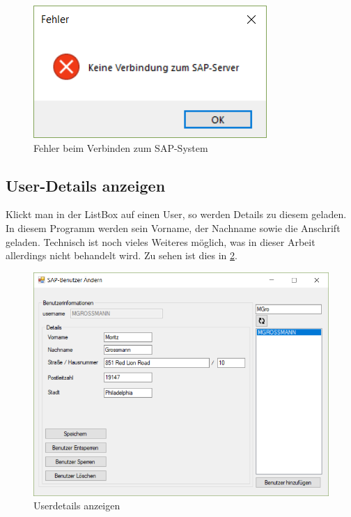 \begin{figure}[h]
	\begin{center}
		\includegraphics[]{images/Keine_Verbindung.png}
	\end{center}
	\caption{Fehler beim Verbinden zum SAP-System}
	\label{fig:keine_verbindung}
\end{figure}

\subsection{User-Details anzeigen}

Klickt man in der ListBox auf einen User, so werden Details zu diesem geladen. In diesem Programm werden sein Vorname, der Nachname sowie die Anschrift geladen. 
Technisch ist noch vieles Weiteres möglich, was in dieser Arbeit allerdings nicht behandelt wird. Zu sehen ist dies in \ref{fig:user_anzeigen}. 

\begin{figure}[h]
	\begin{center}
		\includegraphics[width=\textwidth]{images/User_Anzeigen.png}
	\end{center}
	\caption{Userdetails anzeigen}
	\label{fig:user_anzeigen}
\end{figure}

